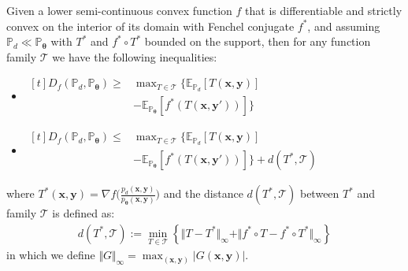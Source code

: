 \begin{theorem} \label{thm:f_div}
Given a lower semi-continuous convex function $f$ that is differentiable and strictly convex on the interior of its domain with Fenchel conjugate $f^*$, and assuming $\mathbb{P}_d \ll \mathbb{P}_{\boldsymbol{\theta}}$ with $T^*$ and $f^*\!\circ T^*$ bounded on the support, then for any function family $\mathcal{T}$ we have the following inequalities:
\begin{itemize}
    \item[(i)]
    $\begin{aligned}[t]
        D_{f}(\mathbb{P}_d,\mathbb{P}_{\boldsymbol{\theta}}) \geq & \max_{T\in\mathcal{T}} \Big\{ \mathbb{E}_{\mathbb{P}_d}[T(\boldsymbol{x},\boldsymbol{y})] \\
        & - \mathbb{E}_{\mathbb{P}_{\boldsymbol{\theta}}}[f^{*}(T(\boldsymbol{x},\boldsymbol{y}'))] \Big\}
    \end{aligned}$

    \item[(ii)]
    $\begin{aligned}[t]
        D_{f}(\mathbb{P}_d,\mathbb{P}_{\boldsymbol{\theta}}) \leq & \max_{T\in\mathcal{T}} \Big\{ \mathbb{E}_{\mathbb{P}_d}[T(\boldsymbol{x},\boldsymbol{y})] \\
        & - \mathbb{E}_{\mathbb{P}_{\boldsymbol{\theta}}}[f^{*}(T(\boldsymbol{x},\boldsymbol{y}'))] \Big\} + d(T^*,\mathcal{T})
    \end{aligned}$
\end{itemize}
where $T^{*}(\boldsymbol{x},\boldsymbol{y})=\nabla f \big( \frac{ p_{d}(\boldsymbol{x},\boldsymbol{y})}{p_{\boldsymbol{\theta}}(\boldsymbol{x}, \boldsymbol{y})} \big)$ and the distance $d(T^{*},\mathcal{T})$ between $T^*$ and family $\mathcal{T}$ is defined as:
\begin{equation*}
\begin{split}
d(T^{*},\mathcal{T}) := \min_{T\in\mathcal{T}}\left\{ \Vert T-T^{*}\Vert_{\infty}+\Vert f^{*}\circ T-f^{*}\circ T^{*}\Vert_{\infty}\right\}
\end{split}
\end{equation*}
in which we define $\Vert G\Vert_{\infty}=\max_{\left(\boldsymbol{x},\boldsymbol{y}\right)}\left|G\left(\boldsymbol{x},\boldsymbol{y}\right)\right|$.
\end{theorem}

